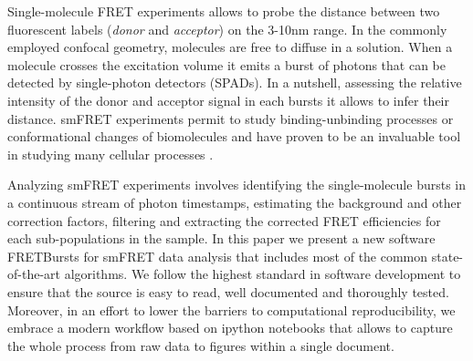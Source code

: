 
Single-molecule FRET experiments allows to probe the distance between two fluorescent labels (\textit{donor} and \textit{acceptor}) on the 3-10nm range. In the commonly employed confocal geometry, molecules are free to diffuse in a solution. When a molecule crosses the excitation volume it emits a burst of photons that can be detected by single-photon detectors (SPADs). In a nutshell, assessing the relative intensity of the donor and acceptor signal in each bursts it allows to infer their distance. smFRET experiments permit to study binding-unbinding processes or conformational changes of biomolecules and have proven to be an invaluable tool in studying many cellular processes \cite{Kapanidis_2006}.

Analyzing smFRET experiments involves identifying the single-molecule bursts in a continuous stream of photon timestamps, estimating the background and other correction factors, filtering and extracting the corrected FRET efficiencies for each sub-populations in the sample. In this paper we present a new software FRETBursts for smFRET data analysis that includes most of the common state-of-the-art algorithms. We follow the highest standard in software development to ensure that the source is easy to read, well documented and thoroughly tested. Moreover, in an effort to lower the barriers to computational reproducibility, we embrace a modern workflow based on ipython notebooks that allows to capture the whole process from raw data to figures within a single document.
